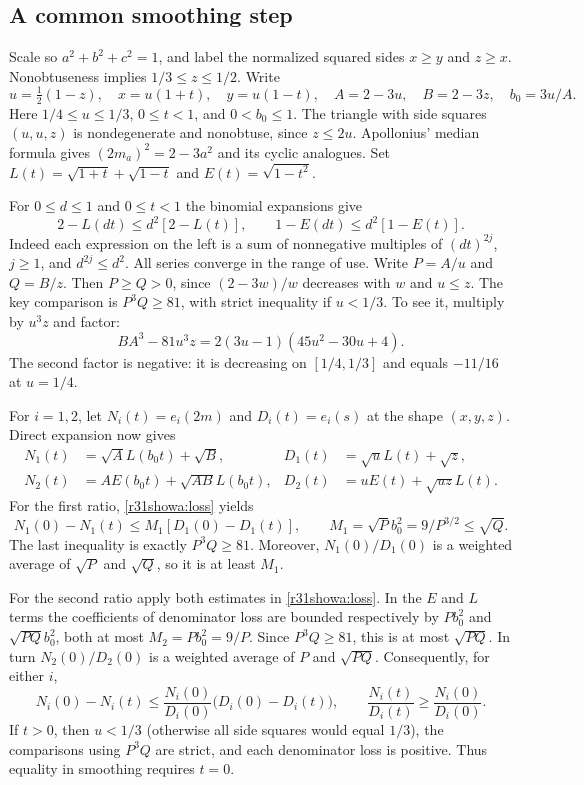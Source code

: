 \documentclass[11pt,a4paper]{article}
\numberwithin{equation}{section}
\theoremstyle{definition}
\theoremstyle{remark}
\begin{document}
\subsection*{A common smoothing step}
Scale so $a^2+b^2+c^2=1$, and label the normalized squared sides
$x\ge y$ and $z\ge x$. Nonobtuseness implies $1/3\le z\le1/2$.
Write
\[
 u=\tfrac12(1-z),\quad x=u(1+t),\quad y=u(1-t),\quad
 A=2-3u,\quad B=2-3z,\quad b_0=3u/A .
\]
Here $1/4\le u\le1/3$, $0\le t<1$, and $0<b_0\le1$. The triangle
with side squares $(u,u,z)$ is nondegenerate and nonobtuse, since
$z\le2u$. Apollonius' median formula gives $(2m_a)^2=2-3a^2$
and its cyclic analogues. Set $L(t)=\sqrt{1+t}+\sqrt{1-t}$ and
$E(t)=\sqrt{1-t^2}$.

For $0\le d\le1$ and $0\le t<1$ the binomial expansions give
\begin{equation}
 2-L(dt)\le d^2[2-L(t)],\qquad
 1-E(dt)\le d^2[1-E(t)]. \label{r31showa:loss}
\end{equation}
Indeed each expression on the left is a sum of nonnegative multiples
of $(dt)^{2j}$, $j\ge1$, and $d^{2j}\le d^2$. All series converge
in the range of use. Write $P=A/u$ and $Q=B/z$.
Then $P\ge Q>0$, since $(2-3w)/w$ decreases with $w$ and $u\le z$.
The key comparison is $P^3Q\ge81$, with strict inequality if $u<1/3$.
To see it, multiply by $u^3z$ and factor:
\[
 B A^3-81u^3 z=2(3u-1)(45u^2-30u+4).
\]
The second factor is negative: it is decreasing on $[1/4,1/3]$
and equals $-11/16$ at $u=1/4$.

For $i=1,2$, let $N_i(t)=e_i(2m)$ and $D_i(t)=e_i(s)$ at the shape
$(x,y,z)$. Direct expansion now gives
\begin{align*}
 N_1(t)&=\sqrt A L(b_0t)+\sqrt B,
 &D_1(t)&=\sqrt u L(t)+\sqrt z,\\
 N_2(t)&=A E(b_0 t)+\sqrt{AB}L(b_0t),
 &D_2(t)&=uE(t)+\sqrt{uz}L(t).
\end{align*}
For the first ratio, \eqref{r31showa:loss} yields
\[
 N_1(0)-N_1(t)\le M_1[D_1(0)-D_1(t)],\qquad
 M_1=\sqrt P b_0^2=9/P^{3/2}\le\sqrt Q.
\]
The last inequality is exactly $P^3Q\ge81$. Moreover,
$N_1(0)/D_1(0)$ is a weighted average of $\sqrt P$ and $\sqrt Q$,
so it is at least $M_1$.

For the second ratio apply both estimates in \eqref{r31showa:loss}. In the
$E$ and $L$ terms the coefficients of denominator loss are bounded
respectively by $Pb_0^2$ and $\sqrt{PQ}b_0^2$, both at most
$M_2=Pb_0^2=9/P$. Since $P^3Q\ge81$, this is at most $\sqrt{PQ}$.
In turn $N_2(0)/D_2(0)$ is a weighted average of $P$ and $\sqrt{PQ}$.
Consequently, for either $i$,
\[
 N_i(0)-N_i(t)\le \frac{N_i(0)}{D_i(0)}
                     \bigl(D_i(0)-D_i(t)\bigr),
 \qquad \frac{N_i(t)}{D_i(t)}\ge \frac{N_i(0)}{D_i(0)}.
\]
If $t>0$, then $u<1/3$ (otherwise all side squares would equal $1/3$),
the comparisons using $P^3Q$ are strict, and each denominator loss is
positive. Thus equality in smoothing requires $t=0$.
\end{document}
